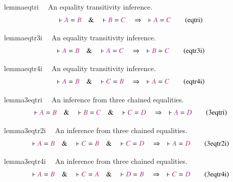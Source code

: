 \begin{restatable}{lemma}{eqtri}~~ An equality transitivity inference. 
~
\begin{align}
\vdash \mc{A} = \mc{B}\quad\&\quad \vdash \mc{B} = \mc{C}\quad\Rightarrow\quad
    \vdash \mc{A} = \mc{C}\label{eq:eqtri}\tag{eqtri}
\end{align}
\end{restatable}

\begin{restatable}{lemma}{eqtr3i}~~ An equality transitivity inference. 
~
\begin{align}
\vdash \mc{A} = \mc{B}\quad\&\quad \vdash \mc{A} = \mc{C}\quad\Rightarrow\quad
    \vdash \mc{B} = \mc{C}\label{eq:eqtr3i}\tag{eqtr3i}
\end{align}
\end{restatable}

\begin{restatable}{lemma}{eqtr4i}~~ An equality transitivity inference. 
~
\begin{align}
\vdash \mc{A} = \mc{B}\quad\&\quad \vdash \mc{C} = \mc{B}\quad\Rightarrow\quad
    \vdash \mc{A} = \mc{C}\label{eq:eqtr4i}\tag{eqtr4i}
\end{align}
\end{restatable}

\begin{restatable}{lemma}{3eqtri}~~ An inference from three chained equalities. 
~
\begin{align}
\vdash \mc{A} = \mc{B}\quad\&\quad \vdash \mc{B} = \mc{C}\quad\&\quad \vdash
    \mc{C} = \mc{D}\quad\Rightarrow\quad \vdash \mc{A} =
    \mc{D}\label{eq:3eqtri}\tag{3eqtri}
\end{align}
\end{restatable}

\begin{restatable}{lemma}{3eqtr2i}~~ An inference from three chained equalities.
~
\begin{align}
\vdash \mc{A} = \mc{B}\quad\&\quad \vdash \mc{C} = \mc{B}\quad\&\quad \vdash
    \mc{C} = \mc{D}\quad\Rightarrow\quad \vdash \mc{A} =
    \mc{D}\label{eq:3eqtr2i}\tag{3eqtr2i}
\end{align}
\end{restatable}

\begin{restatable}{lemma}{3eqtr4i}~~ An inference from three chained equalities.
~  ~
\begin{align}
\vdash \mc{A} = \mc{B}\quad\&\quad \vdash \mc{C} = \mc{A}\quad\&\quad \vdash
    \mc{D} = \mc{B}\quad\Rightarrow\quad \vdash \mc{C} =
    \mc{D}\label{eq:3eqtr4i}\tag{3eqtr4i}
\end{align}
\end{restatable}

